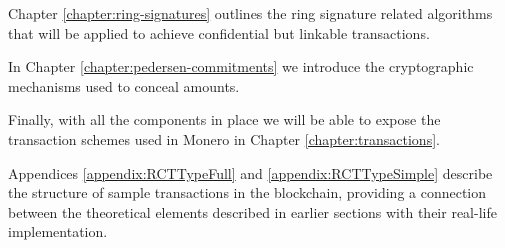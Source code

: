 Chapter \ref{chapter:ring-signatures} outlines the ring signature related algorithms that will be applied to achieve
confidential but linkable transactions.

In Chapter \ref{chapter:pedersen-commitments} we introduce the cryptographic mechanisms used to conceal amounts.

Finally, with all the components in place we will be able to expose the transaction
schemes used in Monero in Chapter \ref{chapter:transactions}.




Appendices \ref{appendix:RCTTypeFull} and \ref{appendix:RCTTypeSimple} describe the structure of sample
transactions in the blockchain, providing a connection between the theoretical elements described in earlier sections with 
their real-life implementation.







